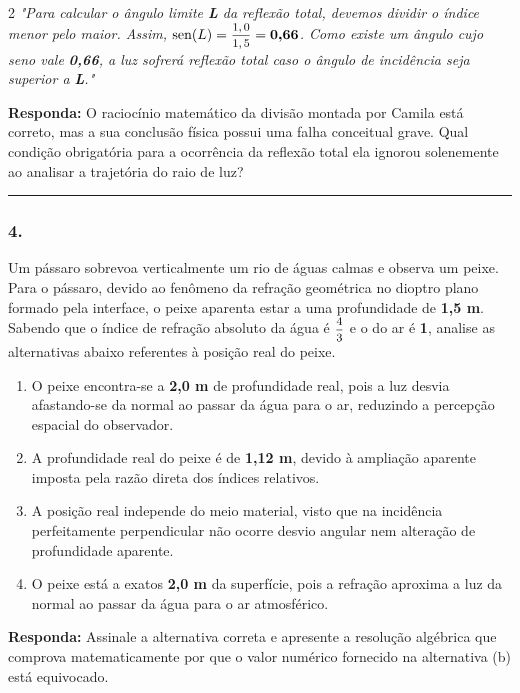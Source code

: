 \documentclass[twoside, 10pt, a4paper]{article}
\newlength{\espacoPreQuestao}\setlength{\espacoPreQuestao}{0.1cm}
\newlength{\espacoQuestao}\setlength{\espacoQuestao}{0.2cm}
\newlength{\espacoAlt}\setlength{\espacoAlt}{0.2cm}
\begin{document}
\begin{multicols*}{2}
\textit{"Para calcular o ângulo limite \textbf{L} da reflexão total, devemos dividir o índice menor pelo maior. Assim, $ \text{sen}(L) = \mfrac{1,0}{1,5} = \textbf{0,66} $. Como existe um ângulo cujo seno vale \textbf{0,66}, a luz sofrerá reflexão total caso o ângulo de incidência seja superior a \textbf{L}."}
\begin{boxresponda}
\textbf{Responda:} O raciocínio matemático da divisão montada por Camila está correto, mas a sua conclusão física possui uma falha conceitual grave. Qual condição obrigatória para a ocorrência da reflexão total ela ignorou solenemente ao analisar a trajetória do raio de luz?
\end{boxresponda}
\par\vspace{\espacoQuestao}

\noindent\textcolor{CorLinha}{\rule{\linewidth}{0.5pt}} 
\par\vspace{\espacoPreQuestao}
\subsubsection*{4.} Um pássaro sobrevoa verticalmente um rio de águas calmas e observa um peixe. Para o pássaro, devido ao fenômeno da refração geométrica no dioptro plano formado pela interface, o peixe aparenta estar a uma profundidade de \textbf{1,5 m}. Sabendo que o índice de refração absoluto da água é $ \mfrac{4}{3} $ e o do ar é \textbf{1}, analise as alternativas abaixo referentes à posição real do peixe.
\begin{enumerate}[label=\alph*), itemsep=\espacoAlt]
\item O peixe encontra-se a \textbf{2,0 m} de profundidade real, pois a luz desvia afastando-se da normal ao passar da água para o ar, reduzindo a percepção espacial do observador.
\item A profundidade real do peixe é de \textbf{1,12 m}, devido à ampliação aparente imposta pela razão direta dos índices relativos.
\item A posição real independe do meio material, visto que na incidência perfeitamente perpendicular não ocorre desvio angular nem alteração de profundidade aparente.
\item O peixe está a exatos \textbf{2,0 m} da superfície, pois a refração aproxima a luz da normal ao passar da água para o ar atmosférico.
\end{enumerate}
\begin{boxresponda}
\textbf{Responda:} Assinale a alternativa correta e apresente a resolução algébrica que comprova matematicamente por que o valor numérico fornecido na alternativa (b) está equivocado.
\end{boxresponda}
\par\vspace{\espacoQuestao}


\end{multicols*}
\end{document}
